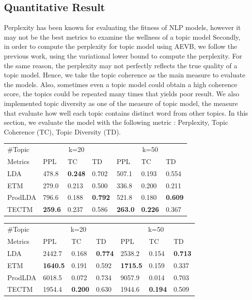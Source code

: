 \subsection{Quantitative Result}
Perplexity has been known for evaluating the fitness of NLP models, however it may not be the best metrics to examine the wellness of a topic model\cite{newman_automatic_2010}
Secondly, in order to compute the perplexity for topic model using AEVB, we follow the previous work, using the variational lower bound to compute the perplexity.
For the same reason, the perplexity may not perfectly reflects the true quality of a topic model. 
Hence, we take the topic coherence \cite{mimno_optimizing_2011} as the main measure to evaluate the models.
Also, sometimes even a topic model could obtain a high coherence score, the topics could be repeated many times that yields poor result. 
We also implemented topic diversity \cite{dieng_topic_2019} as one of the measure of topic model, the measure that evaluate how well each topic contains distinct word from other topics. 
In this section, we evaluate the model with the following metric : Perplexity, Topic Coherence (TC), Topic Diversity (TD).
\begin{table}[h]
\centering
\begin{tabular}{lllllll}
\hline
\#Topic     & \multicolumn{3}{c}{k=20} & \multicolumn{3}{c}{k=50} \\
Metrics     & PPL     & TC     & TD    & PPL     & TC     & TD    \\ \hline
LDA     & 478.8 & \textbf{0.248} & 0.702 & 507.1 & 0.193 & 0.554 \\
ETM     & 279.0 & 0.213 & 0.500 & 336.8 & 0.200 & 0.211 \\
ProdLDA & 796.6 & 0.188 & \textbf{0.792} & 521.8 & 0.180 & \textbf{0.609} \\
TECTM   & \textbf{259.6} & 0.237 & 0.586 & \textbf{263.0} & \textbf{0.226} & 0.367
\\ \hline
\end{tabular}
\end{table}
\begin{table}[h]
\centering
\begin{tabular}{lllllll}
\hline
\#Topic     & \multicolumn{3}{c}{k=20} & \multicolumn{3}{c}{k=50} \\
Metrics     & PPL      & TC      & TD  & PPL      & TC      & TD  \\
\hline
LDA     & 2442.7 & 0.168 & \textbf{0.774} & 2538.2 & 0.154 & \textbf{0.713} \\
ETM     & \textbf{1640.5} & 0.191 & 0.592 & \textbf{1715.5} & 0.159 & 0.337 \\
ProdLDA & 6018.5 & 0.072 & 0.734 & 9057.9 & 0.014 & 0.703 \\
TECTM   & 1954.4 & \textbf{0.200} & 0.630 & 1944.6 & \textbf{0.194} & 0.509 \\
\hline
\end{tabular}
\end{table}

